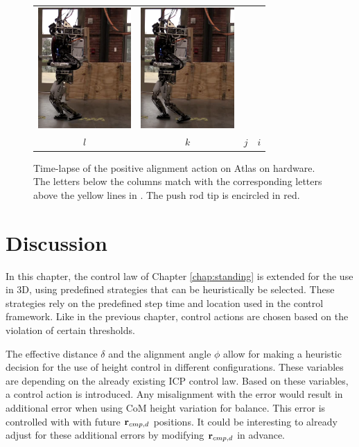 \begin{figure}
\begin{tabular}{cccc}
    \includegraphics[width=1.4in]{STYLESTUFF/atw10} &
    \includegraphics[width=1.4in]{STYLESTUFF/atw9} \\
    $l$ & $k$ & $j$ & $i$ 
  \end{tabular}
  \caption{Time-lapse of the positive alignment action on Atlas on hardware. The letters below the columns match with the corresponding letters above the yellow lines in . The push rod tip is encircled in red.}
  \label{fig:atw}
\end{figure}
\section{Discussion}
In this chapter, the control law of Chapter \ref{chap:standing} is extended for the use in \ac{3D}, using predefined strategies that can be heuristically be selected. These strategies rely on the predefined step time and location used in the control framework. Like in the previous chapter, control actions are chosen based on the violation of certain thresholds. 

The effective distance $\delta$ and the alignment angle $\phi$ allow for making a heuristic decision for the use of height control in different configurations. These variables are depending on the already existing \ac{ICP} control law. Based on these variables, a control action is introduced. Any misalignment with the error would result in additional error when using \ac{CoM} height variation for balance. This error is controlled with with future $\mathbf{r}_{cmp,d}$ positions. It could be interesting to already adjust for these additional errors by modifying $\mathbf{r}_{cmp,d}$ in advance.

